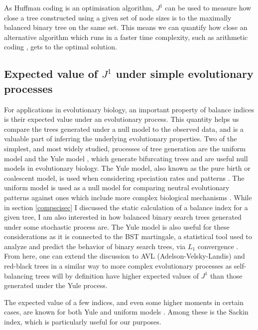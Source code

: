 As Huffman coding is an optimisation algorithm, $J^1$ can be used to measure how
close a tree constructed using a given set of node sizes is to the maximally
balanced binary tree on the same set. This means we can quantify how close an
alternative algorithm which runs in a faster time complexity, such as arithmetic
coding \citep{pasco_source_1977}, gets to the optimal solution.

\subsection{Expected value of $J^1$ under simple evolutionary processes}\label{expsection}

For applications in evolutionary biology, an important property of balance
indices is their expected value under an evolutionary process. This quantity
helps us compare the trees generated under a null model to the observed data,
and is a valuable part of inferring the underlying evolutionary properties. Two
of the simplest, and most widely studied, processes of tree generation are the
uniform model \citep{rosen_vicariant_1978} and the Yule model
\citep{yule_iimathematical_1925}, which generate bifurcating trees and are
useful null models in evolutionary biology. The Yule model, also known as the
pure birth or coalescent model, is used when considering speciation rates and
patterns \citep{aldous_stochastic_2001, steel_properties_2001}. The uniform
model is used as a null model for comparing neutral evolutionary patterns
against ones which include more complex biological mechanisms
\citep{mooers_inferring_1997, mckenzie_distributions_2000}. While in section
\ref{compscisec} I discussed the static calculation of a balance index for a
given tree, I am also interested in how balanced binary search trees generated
under some stochastic process are. The Yule model is also useful for these
considerations as it is connected to the BST martingale, a statistical tool
used to analyze and predict the behavior of binary search trees, via $L_1$
convergence \citep{chauvin_connecting_2004}. From here, one can extend the
discussion to AVL (Adelson-Velsky-Landis) and red-black trees
\cite{knuth_art_1997} in a similar way to more complex evolutionary processes
as self-balancing trees will by definition have higher expected values of $J^1$
than those generated under the Yule process. \par
The expected value of a few indices, and even some higher moments in certain
cases, are known for both Yule and uniform models \citep{mir_new_2013,
m_coronado_sackins_2020, goh_two_2022}. Among these is the Sackin index, which
is particularly useful for our purposes. \par

